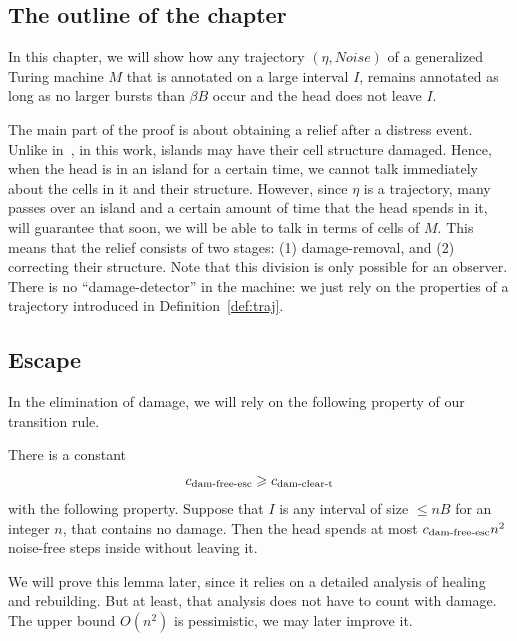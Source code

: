 \documentclass[12pt]{memoir}
\def\B{B}
\newcommand{\Noise}{\mathit{Noise}}
\newcommand{\cns}[1]{c_{\textrm{\upshape #1}}}
\newcommand{\cDamFreeEsc}{\cns{dam-free-esc}}
\newcommand{\cDamClearT}{\cns{dam-clear-t}}
\begin{document}
\subsection{The outline of the chapter}

 In this chapter, we will show how any trajectory \( (\eta, \Noise) \) 
 of a generalized Turing machine \( M \) 
 that is annotated on a large interval \( I \), remains annotated
 as long as no larger bursts than \( \beta\B \) occur and the
 head does not leave \( I \).

 The main part of the proof is about obtaining a relief
 after a distress event.
 Unlike in~\cite{burstyTuring12Conf}, in this work, islands 
 may have their cell structure damaged.
 Hence, when the head is in an island for a certain
 time, we cannot talk immediately about the cells in it
 and their structure.
 However, since \( \eta \) is a trajectory,
 many passes over an island and a certain amount of time
 that the head spends in it, will guarantee that
 soon, we will be able to talk in terms of cells of \( M \).
 This means that the relief consists of two stages: (1)
 damage-removal, and (2) correcting their structure.
Note that this division is only possible for an observer.
There is no ``damage-detector'' in the machine:
we just rely on the properties of a 
trajectory introduced in Definition~\ref{def:traj}.


\subsection{Escape}

In the elimination of damage, we will rely on the following property of our transition rule.

\begin{lemma}\label{lem:dam-free-esc}
 There is a constant
\begin{align}\label{eq:cns.dam-free-esc}
  \cDamFreeEsc \ge\cDamClearT 
 \end{align}
with the following property.
Suppose that \( I \) is any interval of size \( \le n\B \) for an integer \( n \),
that contains no damage.
Then the head spends at most \( \cDamFreeEsc  n^{2} \) noise-free steps inside without leaving it.
\end{lemma}

We will prove this lemma later, since it relies on a detailed analysis of healing 
and rebuilding.
But at least, that analysis does not have to count with damage.
The upper bound \( O(n^{2}) \) is pessimistic, we may later improve it.
\end{document}
